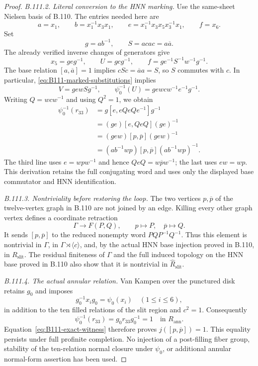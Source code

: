 \begin{proof}
\emph{B.111.2. Literal conversion to the HNN marking.}
Use the same-sheet Nielsen basis of B.110.  The entries needed here
are
\[
 a=x_1,\qquad b=x_1^{-1}x_3x_1,\qquad
 e=x_1^{-1}x_3x_5x_3^{-1}x_1,\qquad f=x_6.
\]
Set
\[
 g=ab^{-1},\qquad S=acac=a\overline a.
\]
The already verified inverse changes of generators give
\begin{equation}\label{eq:B111-marked-substitutions}
 x_5=g e g^{-1},\qquad U=g c g^{-1},\qquad
 f=g e^{-1}S^{-1}w^{-1}g^{-1}.
\end{equation}
The base relation $[a,\overline a]=1$ implies
$cSc=\overline a a=S$, so $S$ commutes with $c$.
In particular, \eqref{eq:B111-marked-substitutions} implies
\[
 V=g e w S g^{-1},\qquad
 \psi_0^{-1}(U)=g e w c w^{-1}e^{-1}g^{-1}.
\]
Writing $Q=wcw^{-1}$ and using $Q^2=1$, we obtain
\begin{align}
 \psi_0^{-1}(r_{33})
   &=g[e,eQeQe^{-1}]g^{-1}\\
   &=(g e)[e,QeQ](g e)^{-1}\\
   &=(g e w)[p,\overline p](g e w)^{-1}\\
   &=(a b^{-1}w p)[p,\overline p]
                         (a b^{-1}w p)^{-1}.
 \label{eq:B111-exact-witness}
\end{align}
The third line uses $e=wpw^{-1}$ and hence
$QeQ=w\overline p w^{-1}$; the last uses $ew=wp$.
This derivation retains the full conjugating word and uses only the
displayed base commutator and HNN identification.

\emph{B.111.3. Nontriviality before restoring the loop.}
The two vertices $p,\overline p$ of the twelve-vertex graph in B.110
are not joined by an edge.  Killing every other graph vertex defines
a coordinate retraction
\[
 \Gamma\longrightarrow F(P,Q),\qquad
 p\longmapsto P,\quad\overline p\longmapsto Q.
\]
It sends $[p,\overline p]$ to the reduced nonempty word
$PQP^{-1}Q^{-1}$.  Thus this element is nontrivial in $\Gamma$,
in $\Gamma\rtimes\langle c\rangle$, and, by the actual HNN
base injection proved in B.110, in $R_{\mathrm{slit}}$.
The residual finiteness of $\Gamma$ and the full induced topology
on the HNN base proved in B.110 also show that it is nontrivial in
$\widehat{R}_{\mathrm{slit}}$.

\emph{B.111.4. The actual annular relation.}
Van Kampen over the punctured disk retains $g_0$ and imposes
\[
 g_0^{-1}x_i g_0=\psi_0(x_i)\quad(1\leq i\leq6),
\]
in addition to the ten filled relations of the slit region and $c^2=1$.
Consequently
\[
 \psi_0^{-1}(r_{33})=g_0r_{33}g_0^{-1}=1
                 \quad\text{in }R_{\mathrm{ann}}.
\]
Equation~\eqref{eq:B111-exact-witness} therefore proves
$j([p,\overline p])=1$.  This equality persists under full profinite
completion.  No injection of a post-filling fiber group, stability of
the ten-relation normal closure under $\psi_0$, or additional annular
normal-form assertion has been used.


\end{proof}
